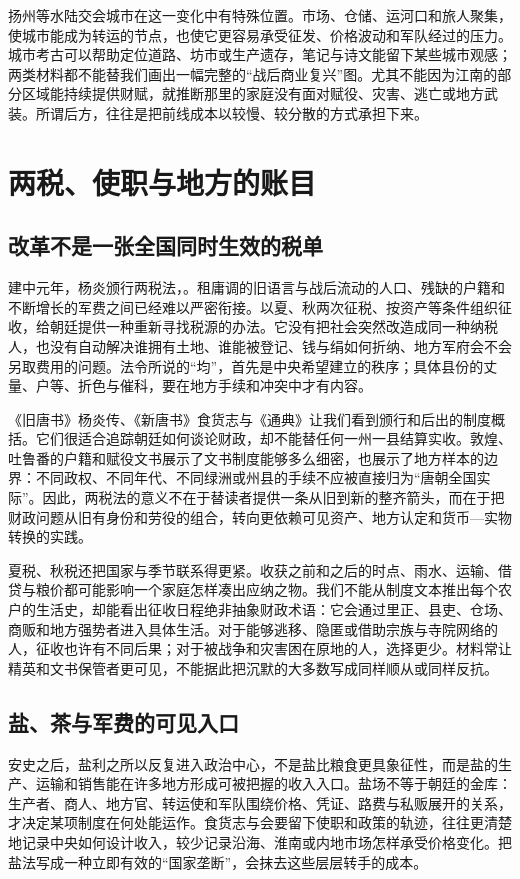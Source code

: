 扬州等水陆交会城市在这一变化中有特殊位置。市场、仓储、运河口和旅人聚集，使城市能成为转运的节点，也使它更容易承受征发、价格波动和军队经过的压力。城市考古可以帮助定位道路、坊市或生产遗存，笔记与诗文能留下某些城市观感；两类材料都不能替我们画出一幅完整的“战后商业复兴”图。尤其不能因为江南的部分区域能持续提供财赋，就推断那里的家庭没有面对赋役、灾害、逃亡或地方武装。所谓后方，往往是把前线成本以较慢、较分散的方式承担下来。

\section{两税、使职与地方的账目}

\subsection{改革不是一张全国同时生效的税单}
建中元年，杨炎颁行两税法，。租庸调的旧语言与战后流动的人口、残缺的户籍和不断增长的军费之间已经难以严密衔接。以夏、秋两次征税、按资产等条件组织征收，给朝廷提供一种重新寻找税源的办法。它没有把社会突然改造成同一种纳税人，也没有自动解决谁拥有土地、谁能被登记、钱与绢如何折纳、地方军府会不会另取费用的问题。法令所说的“均”，首先是中央希望建立的秩序；具体县份的丈量、户等、折色与催科，要在地方手续和冲突中才有内容。

《旧唐书》杨炎传、《新唐书》食货志与《通典》让我们看到颁行和后出的制度概括。它们很适合追踪朝廷如何谈论财政，却不能替任何一州一县结算实收。敦煌、吐鲁番的户籍和赋役文书展示了文书制度能够多么细密，也展示了地方样本的边界：不同政权、不同年代、不同绿洲或州县的手续不应被直接归为“唐朝全国实际”。因此，两税法的意义不在于替读者提供一条从旧到新的整齐箭头，而在于把财政问题从旧有身份和劳役的组合，转向更依赖可见资产、地方认定和货币—实物转换的实践。

夏税、秋税还把国家与季节联系得更紧。收获之前和之后的时点、雨水、运输、借贷与粮价都可能影响一个家庭怎样凑出应纳之物。我们不能从制度文本推出每个农户的生活史，却能看出征收日程绝非抽象财政术语：它会通过里正、县吏、仓场、商贩和地方强势者进入具体生活。对于能够逃移、隐匿或借助宗族与寺院网络的人，征收也许有不同后果；对于被战争和灾害困在原地的人，选择更少。材料常让精英和文书保管者更可见，不能据此把沉默的大多数写成同样顺从或同样反抗。

\subsection{盐、茶与军费的可见入口}
安史之后，盐利之所以反复进入政治中心，不是盐比粮食更具象征性，而是盐的生产、运输和销售能在许多地方形成可被把握的收入入口。盐场不等于朝廷的金库：生产者、商人、地方官、转运使和军队围绕价格、凭证、路费与私贩展开的关系，才决定某项制度在何处能运作。食货志与会要留下使职和政策的轨迹，往往更清楚地记录中央如何设计收入，较少记录沿海、淮南或内地市场怎样承受价格变化。把盐法写成一种立即有效的“国家垄断”，会抹去这些层层转手的成本。

